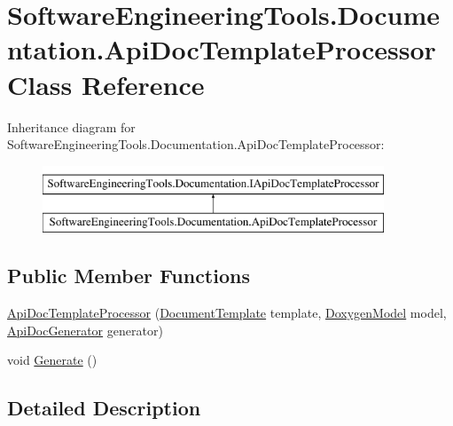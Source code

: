 \hypertarget{class_software_engineering_tools_1_1_documentation_1_1_api_doc_template_processor}{\section{Software\+Engineering\+Tools.\+Documentation.\+Api\+Doc\+Template\+Processor Class Reference}
\label{class_software_engineering_tools_1_1_documentation_1_1_api_doc_template_processor}
}
Inheritance diagram for Software\+Engineering\+Tools.\+Documentation.\+Api\+Doc\+Template\+Processor\+:\begin{figure}[H]
\begin{center}
\leavevmode
\includegraphics[height=2.000000cm]{class_software_engineering_tools_1_1_documentation_1_1_api_doc_template_processor}
\end{center}
\end{figure}
\subsection*{Public Member Functions}
\begin{DoxyCompactItemize}
\item 
\hyperlink{class_software_engineering_tools_1_1_documentation_1_1_api_doc_template_processor_a9aed6ff8c1e67d0890729384a872246c}{Api\+Doc\+Template\+Processor} (\hyperlink{class_software_engineering_tools_1_1_documentation_1_1_document_template}{Document\+Template} template, \hyperlink{class_software_engineering_tools_1_1_documentation_1_1_doxygen_model}{Doxygen\+Model} model, \hyperlink{class_software_engineering_tools_1_1_documentation_1_1_api_doc_generator}{Api\+Doc\+Generator} generator)
\item 
void \hyperlink{class_software_engineering_tools_1_1_documentation_1_1_api_doc_template_processor_ae1088515a108f7d8123505f1a0b08b8c}{Generate} ()
\end{DoxyCompactItemize}


\subsection{Detailed Description}


